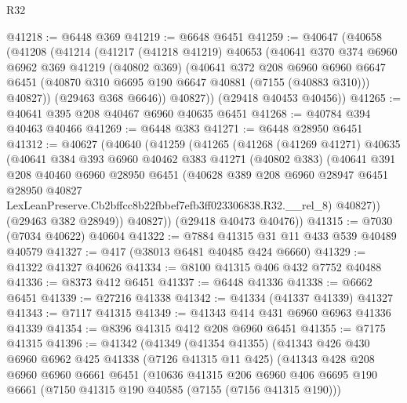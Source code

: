\begin{lexlean}{R32}
\begin{coremodule}
@41218 := @6448 @369
@41219 := @6648 @6451
@41259 := @40647
    (@40658
      (@41208
        (@41214
          (@41217
            (@41218 @41219)
            @40653
            (@40641
              @370
              @374
              @6960
              @6962
              @369
              @41219
              (@40802 @369)
              (@40641
                @372
                @208
                @6960
                @6960
                @6647
                @6451
                (@40870 @310 @6695 @190 @6647 @40881 (@7155 (@40883 @310)))
                @40827))
            (@29463 @368 @6646))
          @40827))
      (@29418 @40453 @40456))
@41265 := @40641 @395 @208 @40467 @6960 @40635 @6451
@41268 := @40784 @394 @40463 @40466
@41269 := @6448 @383
@41271 := @6448 @28950 @6451
@41312 := @40627
    (@40640
      (@41259
        (@41265
          (@41268
            (@41269 @41271)
            @40635
            (@40641
              @384
              @393
              @6960
              @40462
              @383
              @41271
              (@40802 @383)
              (@40641
                @391
                @208
                @40460
                @6960
                @28950
                @6451
                (@40628
                  @389
                  @208
                  @6960
                  @28947
                  @6451
                  @28950
                  @40827
                  LexLeanPreserve.Cb2bffcc8b22fbbef7efb3ff023306838.R32.__rel_8)
                @40827))
            (@29463 @382 @28949))
          @40827))
      (@29418 @40473 @40476))
@41315 := @7030 (@7034 @40622) @40604
@41322 := @7884 @41315 @31 @11 @433 @539 @40489 @40579
@41327 := @417 (@38013 @6481 @40485 @424 @6660)
@41329 := @41322 @41327 @40626
@41334 := @8100 @41315 @406 @432 @7752 @40488
@41336 := @8373 @412 @6451
@41337 := @6448 @41336
@41338 := @6662 @6451
@41339 := @27216 @41338
@41342 := @41334 (@41337 @41339) @41327
@41343 := @7117 @41315
@41349 := @41343 @414 @431 @6960 @6963 @41336 @41339
@41354 := @8396 @41315 @412 @208 @6960 @6451
@41355 := @7175 @41315
@41396 := @41342
    (@41349
      (@41354 @41355)
      (@41343
        @426
        @430
        @6960
        @6962
        @425
        @41338
        (@7126 @41315 @11 @425)
        (@41343
          @428
          @208
          @6960
          @6960
          @6661
          @6451
          (@10636
            @41315
            @206
            @6960
            @406
            @6695
            @190
            @6661
            (@7150 @41315 @190 @40585 (@7155 (@7156 @41315 @190)))

\end{coremodule}
\end{lexlean}
